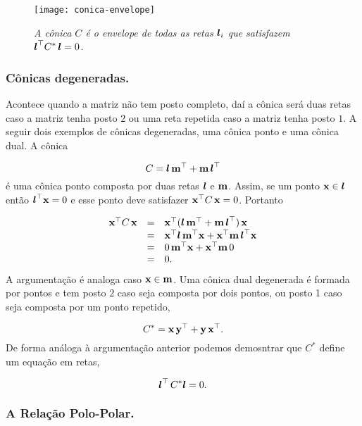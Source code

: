 \begin{figure}[!htb]
\centering
\texttt{[image: conica-envelope]}
\caption{\textit{A cônica $C$ é o envelope de todas as retas $\boldsymbol{l}_i$ que satisfazem $\boldsymbol{l}^\top C^*\,\boldsymbol{l}=0$.}}
\label{fig.conica-envelope}
\end{figure}

\subsubsection{Cônicas degeneradas.}\label{sec.conicas-degeneradas}

Acontece quando a matriz não tem posto completo, daí a cônica será duas retas caso a matriz tenha posto $2$ ou uma reta repetida caso a matriz tenha posto $1$. A seguir dois exemplos de cônicas degeneradas, uma cônica ponto e uma cônica dual. A cônica 

\begin{equation*}
C=\boldsymbol{l}\,{\bf m}^\top+{\bf m}\,\boldsymbol{l}^\top
\end{equation*}
é uma cônica ponto composta por duas retas $\boldsymbol{l}$ e ${\bf m}$. Assim, se um ponto $\mathbf{x}\in\boldsymbol{l}$ então $\boldsymbol{l}^\top\mathbf{x}=0$ e esse ponto deve satisfazer $\mathbf{x}^\top C\,\mathbf{x}=0$. Portanto

\begin{equation*}
\begin{array}{rcl}
\mathbf{x}^\top C\,\mathbf{x}&=&\mathbf{x}^\top(\boldsymbol{l}\,{\bf m}^\top+{\bf m}\,\boldsymbol{l}^\top)\,\mathbf{x}\\
&=&\mathbf{x}^\top\boldsymbol{l}\,{\bf m}^\top\mathbf{x}+\mathbf{x}^\top {\bf m}\,\boldsymbol{l}^\top\mathbf{x}\\
&=&0\,{\bf m}^\top\mathbf{x}+\mathbf{x}^\top{\bf m}\,0\\
&=&0.
\end{array}
\end{equation*}
A argumentação é analoga caso $\mathbf{x}\in{\bf m}$. Uma cônica dual degenerada é formada por pontos e tem posto 2 caso seja composta por dois pontos, ou posto 1 caso seja composta por um ponto repetido, 

\begin{equation*}
C^*=\mathbf{x}\,{\bf y}^\top+{\bf y}\,\mathbf{x}^\top.
\end{equation*}
De forma análoga à argumentação anterior podemos demosntrar que $C^*$ define um equação em retas,

\begin{equation*}
\boldsymbol{l}^\top\,C^*\boldsymbol{l}=0.
\end{equation*}

\subsubsection{A Relação Polo-Polar.}\label{sec.polo-polar}

